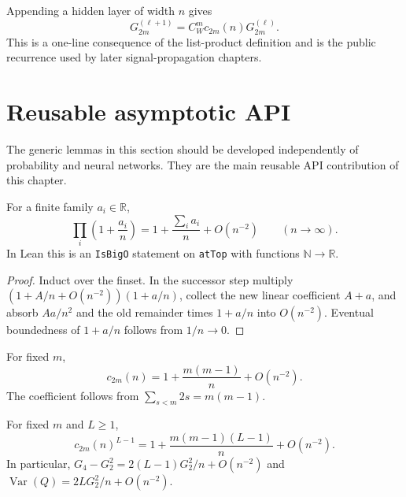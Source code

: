 \begin{theorem}
\label{thm:dln:generalRecursion}
Appending a hidden layer of width $n$ gives
\[
 G_{2m}^{(\ell+1)}=C_W^m c_{2m}(n)G_{2m}^{(\ell)}.
\]
This is a one-line consequence of the list-product definition and is the public recurrence used by
later signal-propagation chapters.
\end{theorem}

\section{Reusable asymptotic API}

The generic lemmas in this section should be developed independently of probability and neural
networks.  They are the main reusable API contribution of this chapter.

\begin{lemma}
\label{lem:dln:finiteProductExpansion}
For a finite family $a_i\in\mathbb R$,
\[
 \prod_i\left(1+\frac{a_i}{n}\right)
  =1+\frac{\sum_i a_i}{n}+O(n^{-2})
 \qquad(n\to\infty).
\]
In Lean this is an \texttt{IsBigO} statement on \texttt{atTop} with functions
$\mathbb N\to\mathbb R$.

\begin{proof}
Induct over the finset.  In the successor step multiply
$(1+A/n+O(n^{-2}))(1+a/n)$, collect the new linear coefficient $A+a$, and absorb
$Aa/n^2$ and the old remainder times $1+a/n$ into $O(n^{-2})$.  Eventual boundedness of
$1+a/n$ follows from $1/n\to0$.
\end{proof}
\end{lemma}

\begin{lemma}
\label{lem:dln:widthFactorExpansion}
For fixed $m$,
\[
 c_{2m}(n)=1+\frac{m(m-1)}n+O(n^{-2}).
\]
The coefficient follows from $\sum_{s<m}2s=m(m-1)$.
\end{lemma}

\begin{lemma}
\label{lem:dln:fixedDepthExpansion}
For fixed $m$ and $L\geq1$,
\[
 c_{2m}(n)^{L-1}
 =1+\frac{m(m-1)(L-1)}n+O(n^{-2}).
\]
In particular, $G_4-G_2^2=2(L-1)G_2^2/n+O(n^{-2})$ and
$\operatorname{Var}(Q)=2LG_2^2/n+O(n^{-2})$.
\end{lemma}

